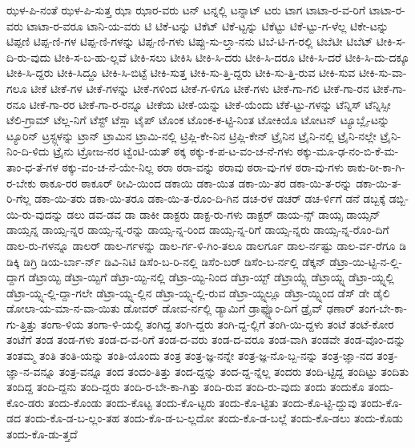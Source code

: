{ಝಳ-ಪಿ-ನಂತೆ
ಝಳ-ಪಿ-ಸುತ್ತ
ಝಾ
ಝಾರ-ವರು
ಟನ್
ಟನ್ನಲ್ಲಿ
ಟನ್ನಾಟ್
ಟರು
ಟಾಗ
ಟಾಟಾ-ರ-ವ-ರಿಗೆ
ಟಾಟಾ-ರ-ವರು
ಟಾಟಾ-ರ-ವರೂ
ಟಾನಿ-ಯ-ವರು
ಟಿ
ಟಿಕೆ-ಟನ್ನು
ಟಿಕೆಟ್
ಟಿಕೆ-ಟ್ಟನ್ನು
ಟಿಕೆಟ್ಟು
ಟಿಕೆ-ಟ್ಟು-ಗ-ಳೆಲ್ಲ
ಟಿಕೇ-ಟನ್ನು
ಟಿಪ್ಪಣಿ
ಟಿಪ್ಪ-ಣಿ-ಗಳ
ಟಿಪ್ಪ-ಣಿ-ಗಳನ್ನು
ಟಿಪ್ಪ-ಣಿ-ಗಳು
ಟಿಪ್ಪು-ಸು-ಲ್ತಾ-ನನು
ಟಿಬೆ-ಟಿ-ಗ-ರಲ್ಲಿ
ಟಿಬೆಟೀ
ಟಿಬೆಟ್
ಟೀಕಿ-ಸ-ದಿ-ರು-ವುದು
ಟೀಕಿ-ಸ-ಬ-ಹು-ಲ್ಲವೆ
ಟೀಕಿ-ಸಲು
ಟೀಕಿಸಿ
ಟೀಕಿ-ಸಿ-ದರು
ಟೀಕಿ-ಸಿ-ದರೂ
ಟೀಕಿ-ಸಿ-ದರೆ
ಟೀಕಿ-ಸಿ-ದು-ದಕ್ಕೂ
ಟೀಕಿ-ಸಿ-ದ್ದರು
ಟೀಕಿ-ಸಿದ್ದೂ
ಟೀಕಿ-ಸಿ-ಬಿಟ್ಟೆ
ಟೀಕಿ-ಸುತ್ತ
ಟೀಕಿ-ಸು-ತ್ತಿ-ದ್ದರು
ಟೀಕಿ-ಸು-ತ್ತಿ-ರುವ
ಟೀಕಿ-ಸುವ
ಟೀಕಿ-ಸು-ವಾ-ಗಲೂ
ಟೀಕೆ
ಟೀಕೆ-ಗಳ
ಟೀಕೆ-ಗಳನ್ನು
ಟೀಕೆ-ಗಳಿಂದ
ಟೀಕೆ-ಗ-ಳಿಗೂ
ಟೀಕೆ-ಗಳು
ಟೀಕೆ-ಗಾ-ಗಲಿ
ಟೀಕೆ-ಗಾ-ರನ
ಟೀಕೆ-ಗಾ-ರನೂ
ಟೀಕೆ-ಗಾ-ರರ
ಟೀಕೆ-ಗಾ-ರ-ರನ್ನೂ
ಟೀಕೆಯ
ಟೀಕೆ-ಯನ್ನು
ಟೀಕೆ-ಯೆಂದು
ಟೆಕೆ-ಟ್ಟು-ಗಳನ್ನು
ಟೆನ್ನಿಸ್
ಟೆನ್ನಿಸ್ಸೀ
ಟೆಲಿ-ಗ್ರಾಮ್
ಟೆಲ್ಲ-ನಿಗೆ
ಟೆಸ್ಟ್
ಟೆಸ್ಲಾ
ಟೈಪ್
ಟೊಂಕ
ಟೊಂಕ-ಕ-ಟ್ಟಿ-ನಿಂತ
ಟೋಕಿಯೊ
ಟೋಟನ್
ಟ್ಯೂಬ್ಲೈ-ಟನ್ನು
ಟ್ಯೂರಿನ್
ಟ್ರಸ್ಟ್ಗಳನ್ನು
ಟ್ರಾನ್
ಟ್ರಾಮಿನ
ಟ್ರಾಮಿ-ನಲ್ಲಿ
ಟ್ರಿಪ್ಲಿ-ಕೇ-ನಿನ
ಟ್ರಿಪ್ಲಿ-ಕೇನ್
ಟ್ರೈನಿನ
ಟ್ರೈನಿ-ನಲ್ಲಿ
ಟ್ರೈನಿ-ನಲ್ಲೇ
ಟ್ರೈನಿ-ನಿಂ-ದಿ-ಳಿದು
ಟ್ರೈನು
ಟ್ರೋಜ-ನರ
ಟ್ವೆಂಟಿ-ಯತ್
ಠಕ್ಕ
ಠಕ್ಕು-ಕ-ಪ-ಟ-ವಂ-ಚ-ನೆ-ಗಳು
ಠಕ್ಕು-ಮೂ-ಢ-ನಂ-ಬಿ-ಕೆ-ಮ-ತಾಂ-ಧ-ತೆ-ಗಳ
ಠಕ್ಕು-ವಂ-ಚ-ನೆ-ಯೇ-ನಿಲ್ಲ
ಠರಾ
ಠರಾ-ವನ್ನು
ಠರಾವು
ಠರಾ-ವು-ಗಳ
ಠರಾ-ವು-ಗಳು
ಠಾಕು-ಠೀ-ಕಾ-ಗಿ-ರ-ಬೇಕು
ಠಾಕೂ-ರರ
ಠಾಕೂರ್
ಠೀವಿ-ಯಿಂದ
ಡಕಾಯಿ
ಡಕಾ-ಯಿತ
ಡಕಾ-ಯಿ-ತರ
ಡಕಾ-ಯಿ-ತ-ರನ್ನು
ಡಕಾ-ಯಿ-ತ-ರಿ-ಗೆಲ್ಲ
ಡಕಾ-ಯಿ-ತರು
ಡಕಾ-ಯಿ-ತರೂ
ಡಕಾ-ಯಿ-ತ-ರೊಂ-ದಿ-ಗಿನ
ಡಚ-ರಳ
ಡಚರ್
ಡಚ-ರ್ಳಿಗೆ
ಡನೆ
ಡಬ್ಬಕ್ಕೆ
ಡಬ್ಬಿ-ಯಿ-ರು-ವುದನ್ನು
ಡಲು
ಡವ-ಡವ
ಡಾ
ಡಾಕೀ
ಡಾಕ್ಟರು
ಡಾಕ್ಟ-ರು-ಗಳು
ಡಾಕ್ಟರ್
ಡಾಯ-ನ್ಸ್
ಡಾಯ್ಸ
ಡಾಯ್ಸನ್
ಡಾಯ್ಸನ್ನ
ಡಾಯ್ಸ-ನ್ನರ
ಡಾಯ್ಸ-ನ್ನ-ರನ್ನು
ಡಾಯ್ಸ-ನ್ನ-ರಿಂದ
ಡಾಯ್ಸ-ನ್ನ-ರಿಗೆ
ಡಾಯ್ಸ-ನ್ನರು
ಡಾಯ್ಸ-ನ್ನ-ರೊಂ-ದಿಗೆ
ಡಾಲ-ರು-ಗಳನ್ನೂ
ಡಾಲರ್
ಡಾಲ-ರ್ಗಳನ್ನು
ಡಾಲ-ರ್ಗ-ಳಿ-ಗಿಂ-ತಲೂ
ಡಾಲರ್ಗೂ
ಡಾಲ-ರ್ನಷ್ಟು
ಡಾಲ-ರ್ವ-ರೆಗೂ
ಡಿ
ಡಿಕ್ಕಿ
ಡಿಗ್ರಿ
ಡಿಯ-ರ್ಬಾ-ರ್ನ್
ಡಿವಿ-ನಿಟಿ
ಡಿಸೆಂ-ಬ-ರಿ-ನಲ್ಲಿ
ಡಿಸೆಂ-ಬರ್
ಡಿಸೆಂ-ಬ-ರ್ನಲ್ಲಿ
ಡೆಕ್ಕನ್
ಡೆಟ್ರಾ-ಯಿ-ಟ್ಟಿ-ನ-ಲ್ಲಿ-ದ್ದಾಗ
ಡೆಟ್ರಾಯ್ಟಿ
ಡೆಟ್ರಾ-ಯ್ಟಿಗೆ
ಡೆಟ್ರಾ-ಯ್ಟಿ-ನಲ್ಲಿ
ಡೆಟ್ರಾ-ಯ್ಟಿ-ನಿಂದ
ಡೆಟ್ರಾ-ಯ್ಟ್
ಡೆಟ್ರಾಯ್ಟ್ಗೆ
ಡೆಟ್ರಾಯ್ಟ್ನ
ಡೆಟ್ರಾ-ಯ್ಟ್ನಲ್ಲಿ
ಡೆಟ್ರಾ-ಯ್ಟ್ನ-ಲ್ಲಿ-ದ್ದಾ-ಗಲೇ
ಡೆಟ್ರಾ-ಯ್ಟ್ನ-ಲ್ಲಿನ
ಡೆಟ್ರಾ-ಯ್ಟ್ನ-ಲ್ಲಿ-ರುವ
ಡೆಟ್ರಾ-ಯ್ಟ್ನಲ್ಲೂ
ಡೆಟ್ರಾ-ಯ್ಟ್ನಿಂದ
ಡೆಸ್
ಡೇ
ಡೈಲಿ
ಡೋಲಾ-ಯ-ಮಾ-ನ-ವಾ-ಯಿತು
ಡೋವರ್
ಡೋವ-ರ್ನಲ್ಲಿ
ಡ್ಯಾಮಿಗೆ
ಡ್ರಾಫ್ಟ್ನೊಂ-ದಿಗೆ
ಡ್ರೈವ್
ಢಣಾರ್
ತಂಗ-ಬೇ-ಕಾ-ಗು-ತ್ತಿತ್ತು
ತಂಗಾ-ಳಿಯ
ತಂಗಾ-ಳಿ-ಯಲ್ಲಿ
ತಂಗಿದ್ದ
ತಂಗಿ-ದ್ದರು
ತಂಗಿ-ದ್ದ-ಲ್ಲಿಗೆ
ತಂಗಿ-ಯಿ-ದ್ದಳು
ತಂಟೆ
ತಂಟೆ-ಕೋರ
ತಂಟೆಗೆ
ತಂಡ
ತಂಡ-ಗಳು
ತಂಡ-ದ-ವ-ರಿಗೆ
ತಂಡ-ದ-ವರು
ತಂಡ-ದ-ವರೂ
ತಂಡ-ವಾಗಿ
ತಂಡವೇ
ತಂಡ-ವೊಂ-ದನ್ನು
ತಂತಮ್ಮ
ತಂತಿ
ತಂತಿ-ಯನ್ನು
ತಂತಿ-ಯೊಂದು
ತಂತ್ರ
ತಂತ್ರ-ಜ್ಞ-ನನ್ನೇ
ತಂತ್ರ-ಜ್ಞ-ನೊ-ಬ್ಬ-ನನ್ನು
ತಂತ್ರ-ಜ್ಞಾ-ನದ
ತಂತ್ರ-ಜ್ಞಾ-ನ-ವನ್ನೂ
ತಂತ್ರ-ವನ್ನೂ
ತಂದ
ತಂದಂ-ತಿತ್ತು
ತಂದ-ದ್ದನ್ನು
ತಂದ-ದ್ದ-ನ್ನೆಲ್ಲ
ತಂದರು
ತಂದಿ-ಟ್ಟಿದ್ದ
ತಂದಿಟ್ಟು
ತಂದಿತು
ತಂದಿದ್ದ
ತಂದಿ-ದ್ದನು
ತಂದಿ-ದ್ದರು
ತಂದಿ-ರ-ಬೇ-ಕಾ-ಗಿತ್ತು
ತಂದಿ-ರುವ
ತಂದಿ-ರು-ವುದು
ತಂದು
ತಂದುಕೊ
ತಂದು-ಕೊಂ-ಡರು
ತಂದು-ಕೊಂಡು
ತಂದು-ಕೊಟ್ಟ
ತಂದು-ಕೊ-ಟ್ಟರು
ತಂದು-ಕೊ-ಟ್ಟಿತು
ತಂದು-ಕೊ-ಟ್ಟಿ-ದ್ದುವು
ತಂದು-ಕೊ-ಡದ
ತಂದು-ಕೊ-ಡ-ಬ-ಲ್ಲಂ-ತಹ
ತಂದು-ಕೊ-ಡ-ಬ-ಲ್ಲದೋ
ತಂದು-ಕೊ-ಡ-ಬಲ್ಲೆ
ತಂದು-ಕೊ-ಡಲು
ತಂದು-ಕೊಡು
ತಂದು-ಕೊ-ಡು-ತ್ತದೆ
}
